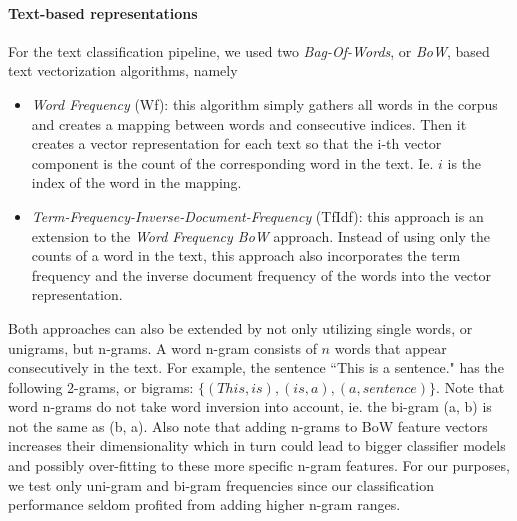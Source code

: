 \paragraph{Text-based representations}
For the text classification pipeline, we used two \textit{Bag-Of-Words}, or \textit{BoW}, based text vectorization algorithms, namely
\begin{itemize}
\item{\textit{Word Frequency} (Wf): this algorithm simply gathers all words in the corpus and creates a mapping between words and consecutive indices. Then it creates a vector representation for each text so that the i-th vector component is the count of the corresponding word in the text. Ie. $i$ is the index of the word in the mapping.}
\item{\textit{Term-Frequency-Inverse-Document-Frequency} (TfIdf): this approach is an extension to the \textit{Word Frequency BoW} approach. Instead of using only the counts of a word in the text, this approach also incorporates the term frequency and the inverse document frequency of the words into the vector representation.}
\end{itemize}
Both approaches can also be extended by not only utilizing single words, or unigrams, but n-grams. A word n-gram consists of $n$ words that appear consecutively in the text.
For example, the sentence ``This is a sentence." has the following 2-grams, or bigrams: $\{ (This, is), (is, a), (a, sentence) \}$.
Note that word n-grams do not take word inversion into account, ie. the bi-gram (a, b) is not the same as (b, a).
Also note that adding n-grams to BoW feature vectors increases their dimensionality which in turn could lead to bigger classifier models and possibly over-fitting to these more specific n-gram features.
For our purposes, we test only uni-gram and bi-gram frequencies since our classification performance seldom profited from adding higher n-gram ranges.

